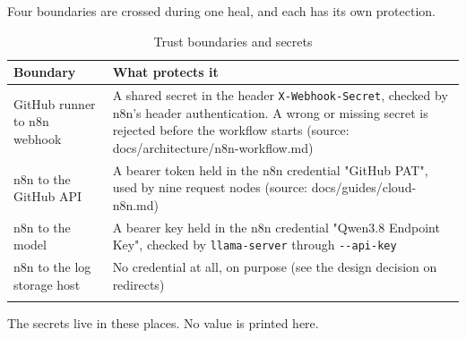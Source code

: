 Four boundaries are crossed during one heal, and each has its own protection.

\begingroup\small
\begin{longtable}{>{\raggedright\arraybackslash}p{0.295\dimexpr\linewidth-4\tabcolsep\relax}>{\raggedright\arraybackslash}p{0.705\dimexpr\linewidth-4\tabcolsep\relax}}
\toprule
\rowcolor{gray!14}\textbf{Boundary} & \textbf{What protects it} \\
\midrule
\endhead
\bottomrule
\endfoot
\endlastfoot
GitHub runner to n8n webhook & A shared secret in the header \texttt{X-\allowbreak{}Webhook-\allowbreak{}Secret}, checked by n8n's header authentication. A wrong or missing secret is rejected before the workflow starts (source: docs/\allowbreak{}architecture/\allowbreak{}n8n-workflow.md) \\
n8n to the GitHub API & A bearer token held in the n8n credential "GitHub PAT", used by nine request nodes (source: docs/\allowbreak{}guides/\allowbreak{}cloud-n8n.md) \\
n8n to the model & A bearer key held in the n8n credential "Qwen3.8 Endpoint Key", checked by \texttt{llama-\allowbreak{}server} through \texttt{-\allowbreak{}-\allowbreak{}api-\allowbreak{}key} \\
n8n to the log storage host & No credential at all, on purpose (see the design decision on redirects) \\
\bottomrule
\caption{Trust boundaries and secrets}\label{tab:04-3}\\
\end{longtable}
\endgroup

The secrets live in these places. No value is printed here.

